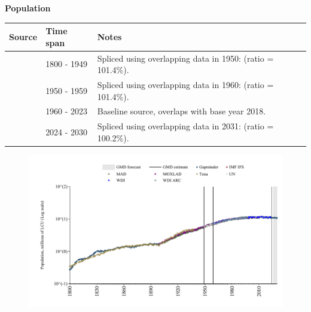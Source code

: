 \documentclass[12pt,a4paper,landscape]{article}
\begin{document}
\begin{adjustbox}{max totalsize={\paperwidth}{\paperheight},center}
\begin{minipage}[t][\textheight][t]{\textwidth}
\vspace*{0.5cm}
{}
\begin{center}
{\Large\bfseries Population}
\end{center}
\vspace{0.5cm}
\begin{table}[H]
\centering
\small
\begin{tabular}{|l|l|l|}
\hline
\textbf{Source} & \textbf{Time span} & \textbf{Notes} \\
\hline
\rowcolor{white}\cite{Gapminder}& 1800 - 1949 &Spliced using overlapping data in 1950: (ratio = 101.4\%). \\
\rowcolor{lightgray}\cite{IMF_IFS}& 1950 - 1959 &Spliced using overlapping data in 1960: (ratio = 101.4\%). \\
\rowcolor{white}\cite{WDI}& 1960 - 2023 &Baseline source, overlaps with base year 2018. \\
\rowcolor{lightgray}\cite{Gapminder}& 2024 - 2030 &Spliced using overlapping data in 2031: (ratio = 100.2\%). \\
\hline
\end{tabular}
\end{table}
\begin{figure}[H]
\centering
\includegraphics[width=\textwidth,height=0.6\textheight,keepaspectratio]{graphs/CUB_pop.pdf}
\end{figure}
\end{minipage}
\end{adjustbox}
\end{document}
